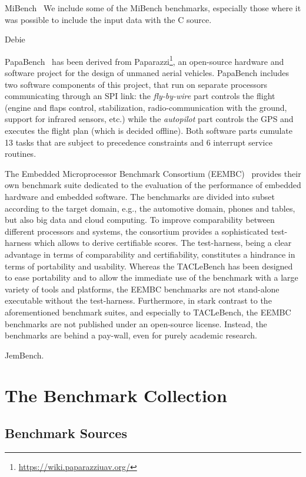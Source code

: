 \documentclass[a4paper,UKenglish]{oasics}
\begin{document}
MiBench~\cite{MiBench} We include some of the MiBench benchmarks, especially
those where it was possible to include the input data with the C source.

Debie~\cite{debie}

PapaBench~\cite{papabench} has been derived from  Paparazzi\footnote{\url{https://wiki.paparazziuav.org/}}, 
an open-source hardware and software project for the design of unmaned aerial vehicles.  PapaBench includes 
two software components of this project, that run on separate processors communicating through an SPI link:
the \textit{fly-by-wire} part controls the flight (engine and flaps control, stabilization, radio-communication 
with the ground, support for infrared sensors, etc.) while the \textit{autopilot} part controls the GPS and 
executes the flight plan (which is decided offline). Both software parts  cumulate 13 tasks that are subject
to precedence constraints and 6 interrupt service routines.

The Embedded Microprocessor Benchmark Consortium (EEMBC)~\cite{eembc} provides their own benchmark suite dedicated to the evaluation of 
the performance of embedded hardware and embedded software.
The benchmarks are divided into subset according to the target domain, e.g., the automotive domain, phones and tables, but also big data and cloud computing.
To improve comparability between different processors and systems, the consortium provides a sophisticated test-harness which allows to derive certifiable scores.
The test-harness, being a clear advantage in terms of comparability and certifiability, constitutes a hindrance in terms of portability and usability.
Whereas the TACLeBench has been designed to ease portability and to allow the immediate use of the benchmark with a large variety of tools and platforms, the EEMBC benchmarks are not stand-alone executable without the test-harness.
Furthermore, in stark contrast to the aforementioned benchmark suites, and especially to TACLeBench, the EEMBC benchmarks are not published under an open-source license. 
Instead, the benchmarks are behind a pay-wall, even for purely academic research.


JemBench.

\section{The Benchmark Collection}
\label{sec:collect}


\subsection{Benchmark Sources}
\end{document}
